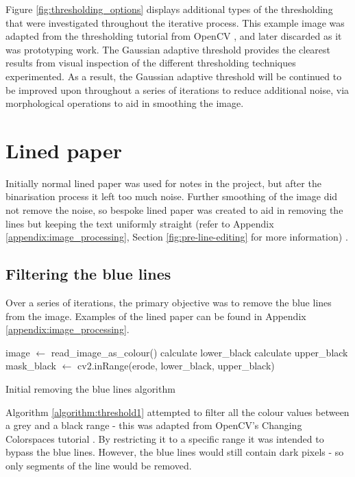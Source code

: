 Figure \ref{fig:thresholding_options} displays additional types of the thresholding that were investigated throughout the iterative process. This example image was adapted from the thresholding tutorial from OpenCV \cite{citeulike:14026982}, and later discarded as it was prototyping work. The Gaussian adaptive threshold provides the clearest results from visual inspection of the different thresholding techniques experimented. As a result, the Gaussian adaptive threshold will be continued to be improved upon throughout a series of iterations to reduce additional noise, via morphological operations to aid in smoothing the image.

\section{Lined paper}
Initially normal lined paper was used for notes in the project, but after the binarisation process it left too much noise. Further smoothing of the image did not remove the noise, so bespoke lined paper was created to aid in removing the lines but keeping the text uniformly straight (refer to Appendix \ref{appendix:image_processing}, Section \ref{fig:pre-line-editing} for more information) .

\subsection{Filtering the blue lines}
Over a series of iterations, the primary objective was to remove the blue lines from the image. Examples of the lined paper can be found in Appendix \ref{appendix:image_processing}.

\begin{algorithm} [H]
\begin{algorithmic}[1]
    \State image $\gets$ read\_image\_as\_colour()
    \State calculate lower\_black
    \State calculate upper\_black
    \State mask\_black $\gets$ cv2.inRange(erode, lower\_black, upper\_black)
  \EndFunction
  \end{algorithmic}
  \caption{Initial removing the blue lines algorithm}
  \label{algorithm:threshold1}
\end{algorithm}

Algorithm \ref{algorithm:threshold1} attempted to filter all the colour values between a grey and a black range - this was adapted from OpenCV's Changing Colorspaces tutorial \cite{citeulike:14026986}. By restricting it to a specific range it was intended to bypass the blue lines. However, the blue lines would still contain dark pixels - so only segments of the line would be removed.


